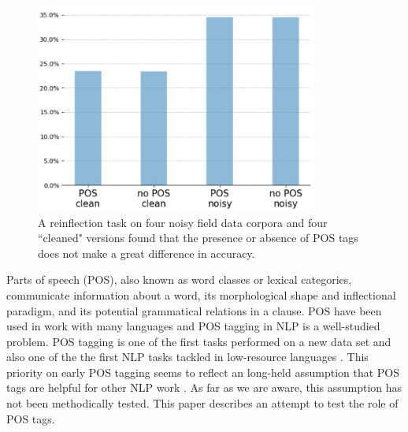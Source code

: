 \begin{figure}
    \centering
    \includegraphics[width=25em]{figs/POS-avgReinfl.jpg}
    \caption[POS Tags in Reinflection of Noisy Data]{A reinflection task on four noisy field data corpora and four ``cleaned" versions found that the presence or absence of POS tags does not make a great difference in accuracy.}
    \label{fig:avgreinfl}
\end{figure}

Parts of speech (POS), also known as word classes or lexical categories, communicate information about a word, its morphological shape and inflectional paradigm, and its potential grammatical relations in a clause. POS have been used in work with many languages and POS tagging in NLP is a well-studied problem. POS tagging is one of the first tasks performed on a new data set and also one of the the first NLP tasks tackled in low-resource languages
\citep{yarowsky-ngai-2001-inducing,cox_probabilistic_2010,de_pauw_resource-light_2012,baldridge_learning_2013,duong_natural_2017,anastasopoulos_computational_2019,millour_unsupervised_2019,eskander_unsupervised_2020}. This priority on early POS tagging seems to reflect an long-held assumption that POS tags are helpful for other NLP work \citep{krauwer_basic_2003}. 
As far as we are aware, this assumption has not been methodically tested. This paper describes an attempt to test the role of POS tags. 

